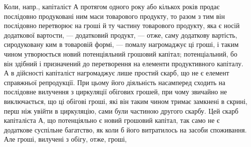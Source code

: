 Коли, напр., капіталіст $А$ протягом одного року або кількох років продає послідовно продуковані ним
маси товарового продукту, то разом з тим він послідовно перетворює на гроші й ту частину товарового
продукту, яка є носій додаткової вартости, — додатковий продукт, — отже, саму додаткову вартість,
сиродуковану ким в товаровій формі, — помалу нагромаджує ці гроші, і таким чином утворюється новий
потенціяльний грошовий капітал; потенціальний, бо він здібний і призначений до перетворення на
елементи продуктивного капіталу. А в дійсності капіталіст нагромаджує лише простий скарб, що не є
елемент справжньої репродукції. При цьому його діяльність насамперед сходить на послідовне вилучення
з циркуляції обігових грошей, при чому звичайно не виключається, що ці обігові гроші, які він таким
чином тримає замкнені в скрині, перш ніж увійти в циркуляцію, сами були частиною другого скарбу. Цей
скарб капіталіста $А$, що потенціяльно є новий грошовий капітал, так само не є додаткове суспільне
багатство, як коли б його витратилось на засоби споживання. Але гроші, вилучені з обігу, отже,
гроші,
\parbreak{}  %

